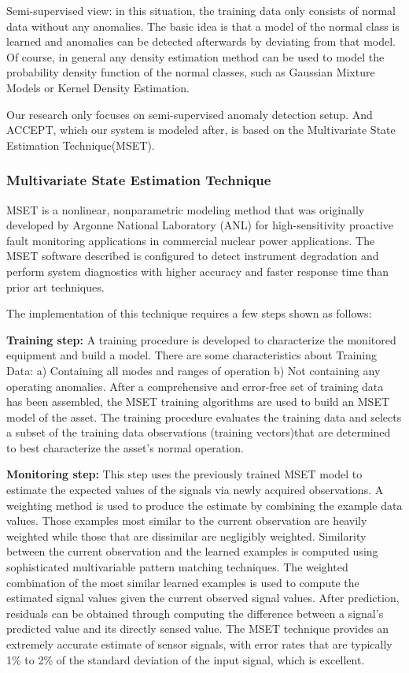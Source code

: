 \documentclass{acm_proc_article-sp}
\begin{document}
Semi-supervised view: in this situation, the training data only consists of normal data without any anomalies. The basic idea is that a model of the normal class is learned and anomalies can be detected afterwards by deviating from that model. Of course, in general any density estimation method can be used to model the probability density function of the normal classes, such as Gaussian Mixture Models\cite{GaussianM} or Kernel Density Estimation\cite{KernelD}.

Our research only focuses on semi-supervised anomaly detection setup. And ACCEPT, which our system is modeled after, is based on the Multivariate State Estimation Technique(MSET).
\newpage

\subsubsection{Multivariate State Estimation Technique}
MSET\cite{MSET} is a nonlinear, nonparametric modeling
method that was originally developed by Argonne National
Laboratory (ANL) for high-sensitivity proactive fault monitoring applications in commercial nuclear power applications. The MSET software described is configured to detect instrument degradation and perform system diagnostics with higher accuracy and faster response time than prior art techniques. 

The implementation of this technique requires a few steps shown as follows:

\textbf{Training step:} A training procedure is developed to characterize the monitored equipment and build a model. There are some characteristics about Training Data: a) Containing all modes and ranges of operation b) Not containing any operating anomalies. 
After a comprehensive and error-free set of training data has been assembled, the MSET training algorithms are used to build an MSET model of the asset. The training procedure evaluates the training data and selects a subset of the training data observations (training vectors)that are determined to best characterize the asset's normal operation. 

\textbf{Monitoring step:} This step uses the previously trained MSET model to estimate the expected values of the signals via newly acquired observations. 
A weighting method is used to produce the estimate by combining the example data values. Those examples most similar to the current observation are heavily weighted while those that are dissimilar are negligibly weighted. Similarity between the current observation and the learned examples is computed using sophisticated multivariable pattern matching techniques. The weighted combination of the most similar learned examples is used to compute the estimated signal values given the current observed signal values. 
After prediction, residuals can be obtained through computing the difference between a signal's predicted value and its directly sensed value. 
The MSET technique provides an extremely accurate estimate of sensor signals, with error rates that are typically 1\% to 2\% of the standard deviation of the input signal, which is excellent.
\end{document}

